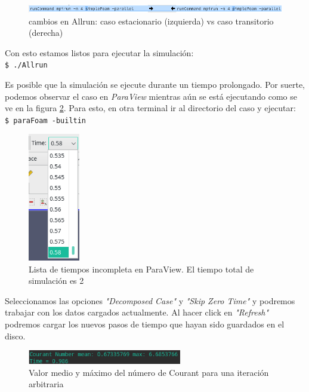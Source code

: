 \documentclass[oneside,a4paper,spanish,links]{amca}
\begin{document}
\begin{figure}[htb]
	\centerline{\includegraphics[width=1\textwidth]{Figuras/03_Allrun.png}} 
	\caption{cambios en Allrun: caso estacionario (izquierda) vs caso transitorio (derecha)} \label{fg:Allrun}
\end{figure}

Con esto estamos listos para ejecutar la simulación:\\
\texttt{\$ ./Allrun}

Es posible que la simulación se ejecute durante un tiempo prolongado. Por suerte, podemos observar el caso en \textit{ParaView} mientras aún se está ejecutando como se ve en la figura \ref{fg:pv_time}. Para esto, en otra terminal ir al directorio del caso y ejecutar:\\
\texttt{\$ paraFoam -builtin}

\begin{figure}[htb]
	\centerline{\includegraphics[width=0.2\textwidth]{Figuras/03_PV_TiempoIncompleto.png}} 
	\caption{Lista de tiempos incompleta en ParaView. El tiempo total de simulación es 2} \label{fg:pv_time}
\end{figure}

Seleccionamos las opciones \textit{"Decomposed Case"} y \textit{"Skip Zero Time"} y podremos trabajar con los datos cargados actualmente. Al hacer click en \textit{"Refresh"} podremos cargar los nuevos pasos de tiempo que hayan sido guardados en el disco.

\begin{figure}[htb]
	\centerline{\includegraphics[width=0.6\textwidth]{Figuras/03_Courant.png}} 
	\caption{Valor medio y máximo del número de Courant para una iteración arbitraria} \label{fg:Courant}
\end{figure}
\end{document}
